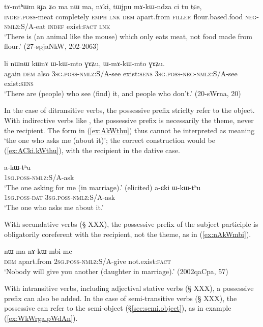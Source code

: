  \begin{exe} 
\ex \label{ex:mAkWndza}
\gll  tɤ-mtʰɯm ʁɟa ʑo ma nɯ ma, nɤki, tɯjpu mɤ-kɯ-ndza ci tu tɕe, \\
\textsc{indef}.\textsc{poss}-meat completely \textsc{emph} \textsc{lnk} \textsc{dem} apart.from \textsc{filler} flour.based.food \textsc{neg}-\textsc{nmlz}:S/A-eat \textsc{indef} exist:\textsc{fact} \textsc{lnk} \\
\glt  `There is (an animal like the mouse) which only eats meat, not food made from flour.' (27-spjaNkW, 202-2063)
\end{exe}

 \begin{exe} 
\ex \label{ex:WmAkWmto} 
\gll  li nɯnɯ kɯnɤ ɯ-kɯ-mto ɣɤʑu, ɯ-mɤ-kɯ-mto ɣɤʑu. \\
again \textsc{dem} also \textsc{3sg}.\textsc{poss}-\textsc{nmlz}:S/A-see exist:\textsc{sens} \textsc{3sg}.\textsc{poss}-\textsc{neg}-\textsc{nmlz}:S/A-see exist:\textsc{sens} \\
\glt `There are (people) who see (find) it, and people who don't.' (20-sWrna, 20)
\end{exe}

In the case of ditransitive verbs, the possessive prefix striclty refer to the object. With indirective verbs like , the possessive prefix is necessarily the theme, never the recipient. The form in (\ref{ex:AkWthu}) thus cannot be interpreted as meaning `the one who asks me (about it)'; the correct construction would be (\ref{ex:ACki.kWthu}), with the recipient in the dative case.

\begin{exe}
\ex \label{ex:AkWthu}
\gll a-kɯ-tʰu  \\
\textsc{1sg.poss}-\textsc{nmlz}:S/A-ask \\
\glt `The one asking for me (in marriage).' (elicited)
\ex \label{ex:ACki.kWthu}
\gll a-ɕki ɯ-kɯ-tʰu  \\
\textsc{1sg.poss}-\textsc{dat} \textsc{3sg}.\textsc{poss}-\textsc{nmlz}:S/A-ask \\ 
\glt `The one who asks me about it.' 
\end{exe}

With secundative verbs (§ XXX), the possessive prefix of the subject participle is obligatorily coreferent with the recipient, not the theme, as in (\ref{ex:nAkWmbi}).

\begin{exe}
\ex \label{ex:nAkWmbi}
\gll nɯ ma nɤ-kɯ-mbi me \\
\textsc{dem} apart.from \textsc{2sg}.\textsc{poss}-\textsc{nmlz}:S/A-give not.exist:\textsc{fact} \\
\glt `Nobody will give you another (daughter in marriage).' (2002qaCpa, 57)
\end{exe}
With intransitive verbs, including adjectival stative verbs (§ XXX), a possessive prefix can also be added. In the case of semi-transitive verbs (§ XXX), the possessive can refer to the semi-object (§\ref{sec:semi.object}), as in example (\ref{ex:WkWrga.pWdAn}).

